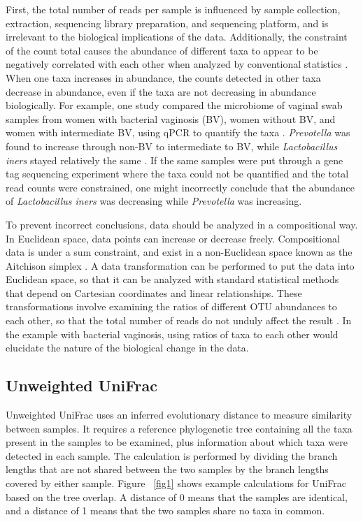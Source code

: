\documentclass[10pt,letterpaper]{article}
\begin{document}
First, the total number of reads per sample is influenced by sample collection, extraction, sequencing library preparation, and sequencing platform, and is irrelevant to the biological implications of the data. Additionally, the constraint of the count total causes the abundance of different taxa to appear to be negatively correlated with each other when analyzed by conventional statistics \cite{lovell2015proportionality}. When one taxa increases in abundance, the counts detected in other taxa decrease in abundance, even if the taxa are not decreasing in abundance biologically. For example, one study compared the microbiome of vaginal swab samples from women with bacterial vaginosis (BV), women without BV, and women with intermediate BV, using qPCR to quantify the taxa \cite{zozaya2010quantitative}. \textit{Prevotella} was found to increase through non-BV to intermediate to BV, while \textit{Lactobacillus iners} stayed relatively the same \cite{zozaya2010quantitative}. If the same samples were put through a gene tag sequencing experiment where the taxa could not be quantified and the total read counts were constrained, one might incorrectly conclude that the abundance of \textit{Lactobacillus iners} was decreasing while \textit{Prevotella} was increasing.

To prevent incorrect conclusions, data should be analyzed in a compositional way. In Euclidean space, data points can increase or decrease freely. Compositional data is under a sum constraint, and exist in a non-Euclidean space known as the Aitchison simplex \cite{aitchison1982statistical}. A data transformation can be performed to put the data into Euclidean space, so that it can be analyzed with standard statistical methods that depend on Cartesian coordinates and linear relationships. These transformations involve examining the ratios of different OTU abundances to each other, so that the total number of reads do not unduly affect the result \cite{gloor2016s} \cite{gloor2016compositional}. In the example with bacterial vaginosis, using ratios of taxa to each other would elucidate the nature of the biological change in the data.

\subsection{Unweighted UniFrac}
Unweighted UniFrac \cite{lozupone2005unifrac} uses an inferred evolutionary distance to measure similarity between samples. It requires a reference phylogenetic tree containing all the taxa present in the samples to be examined, plus information about which taxa were detected in each sample. The calculation is performed by dividing the branch lengths that are not shared between the two samples by the branch lengths covered by either sample. Figure ~\ref{fig1} shows example calculations for UniFrac based on the tree overlap. A distance of 0 means that the samples are identical, and a distance of 1 means that the two samples share no taxa in common.
\end{document}
